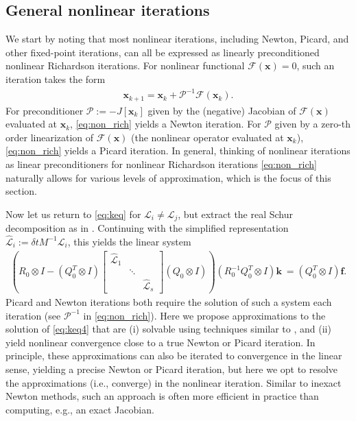 \documentclass[review]{siamart}
\begin{document}
\subsection{General nonlinear iterations}\label{sec:nonlinear:gen}

We start by noting that most nonlinear iterations, including Newton, Picard, and
other fixed-point iterations, can all be expressed as linearly preconditioned
nonlinear Richardson iterations. For nonlinear functional
$\mathcal{F}(\mathbf{x}) = 0$, such an iteration takes the form
%
\begin{align}\label{eq:non_rich}
\mathbf{x}_{k+1} = \mathbf{x}_k + \mathcal{P}^{-1}\mathcal{F}(\mathbf{x}_k).
\end{align}
%
For preconditioner $\mathcal{P} := -J[\mathbf{x}_k]$ given by the (negative)
Jacobian of $\mathcal{F}(\mathbf{x})$ evaluated at $\mathbf{x}_k$, \eqref{eq:non_rich}
yields a Newton iteration. For $\mathcal{P}$ given by a zero-th order linearization
of $\mathcal{F}(\mathbf{x})$ (the nonlinear operator evaluated at $\mathbf{x}_k$),
\eqref{eq:non_rich} yields a Picard iteration. In general, thinking of nonlinear
iterations as linear preconditioners for nonlinear Richardson iterations
\eqref{eq:non_rich} naturally allows for various levels of approximation,
which is the focus of this section. 

Now let us return to \eqref{eq:keq} for $\mathcal{L}_i\neq\mathcal{L}_j$, but
extract the real Schur decomposition as in . Continuing
with the simplified representation $\widehat{\mathcal{L}}_i := \delta t M^{-1}\mathcal{L}_i$,
this yields the linear system
%
\begin{align}\label{eq:keq4}
\left( R_0\otimes I - (Q_0^T\otimes I) \begin{bmatrix}
	\widehat{\mathcal{L}}_1  & \\ & \ddots \\ && \widehat{\mathcal{L}}_s\end{bmatrix}
	(Q_0\otimes I)\right) (R_0^{-1}Q_0^T\otimes I) \mathbf{k}\
= (Q_0^T\otimes I)\mathbf{f}.
\end{align}
%
Picard and Newton iterations both require the solution of such a system each
iteration (see $\mathcal{P}^{-1}$ in \eqref{eq:non_rich}). Here we propose 
approximations to the solution of \eqref{eq:keq4} that are (i) solvable using
techniques similar to \Cref{sec:nonlinear:simp}, and (ii) yield nonlinear 
convergence close to a true Newton or Picard iteration. In principle, these
approximations can also be iterated to convergence in the linear sense, yielding
a precise Newton or Picard iteration, but here we opt to resolve the approximations
(i.e., converge) in the nonlinear iteration. Similar to inexact Newton methods,
such an approach is often more efficient in practice than computing, e.g., an exact
Jacobian. 
\end{document}
